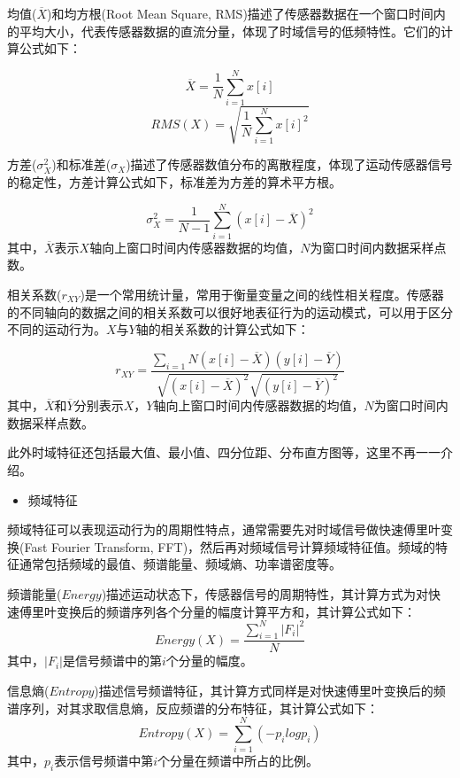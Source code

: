 \par 均值($\overline{X}$)和均方根(Root Mean Square, RMS)描述了传感器数据在一个窗口时间内的平均大小，代表传感器数据的直流分量，体现了时域信号的低频特性。它们的计算公式如下：

\begin{equation}
	\overline{X} = \frac{1}{N}\sum_{i=1}^{N}x[i]
\end{equation}
\begin{equation}
	RMS(X) = \sqrt{\frac{1}{N}\sum_{i=1}^{N}x[i]^2}
\end{equation}
\par 方差($\sigma_X^2$)和标准差($\sigma_X$)描述了传感器数值分布的离散程度，体现了运动传感器信号的稳定性，方差计算公式如下，标准差为方差的算术平方根。

\begin{equation}
	\sigma_X^2 = \frac{1}{N-1}\sum_{i=1}^{N}(x[i]-\overline{X})^2
\end{equation}
其中，$\overline{X}$表示$X$轴向上窗口时间内传感器数据的均值，$N$为窗口时间内数据采样点数。
\par 相关系数($r_{XY}$)是一个常用统计量，常用于衡量变量之间的线性相关程度。传感器的不同轴向的数据之间的相关系数可以很好地表征行为的运动模式，可以用于区分不同的运动行为。$X$与$Y$轴的相关系数的计算公式如下：

\begin{equation}
	r_{XY} = \frac{\sum_{i=1}{N}(x[i] - \overline{X})(y[i] - \overline{Y})}{\sqrt{(x[i] - \overline{X})^2}\sqrt{(y[i] - \overline{Y})^2}}
\end{equation}
其中，$\overline{X}$和$\overline{Y}$分别表示$X$，$Y$轴向上窗口时间内传感器数据的均值，$N$为窗口时间内数据采样点数。
\par 此外时域特征还包括最大值、最小值、四分位距、分布直方图等，这里不再一一介绍。

\begin{itemize}
	\item 频域特征
\end{itemize}
\par 频域特征可以表现运动行为的周期性特点，通常需要先对时域信号做快速傅里叶变换(Fast Fourier Transform, FFT)，然后再对频域信号计算频域特征值。频域的特征通常包括频域的最值、频谱能量、频域熵、功率谱密度等。
\par 频谱能量($Energy$)描述运动状态下，传感器信号的周期特性，其计算方式为对快速傅里叶变换后的频谱序列各个分量的幅度计算平方和，其计算公式如下：
\begin{equation}
	Energy(X) = \frac{\sum_{i=1}^{N}|F_i|^2}{N}
\end{equation}
其中，$|F_i|$是信号频谱中的第$i$个分量的幅度。
\par 信息熵($Entropy$)描述信号频谱特征，其计算方式同样是对快速傅里叶变换后的频谱序列，对其求取信息熵，反应频谱的分布特征，其计算公式如下：
\begin{equation}
	Entropy(X) = \sum_{i=1}^{N}(-p_ilogp_i)
\end{equation}
其中，$p_i$表示信号频谱中第$i$个分量在频谱中所占的比例。
